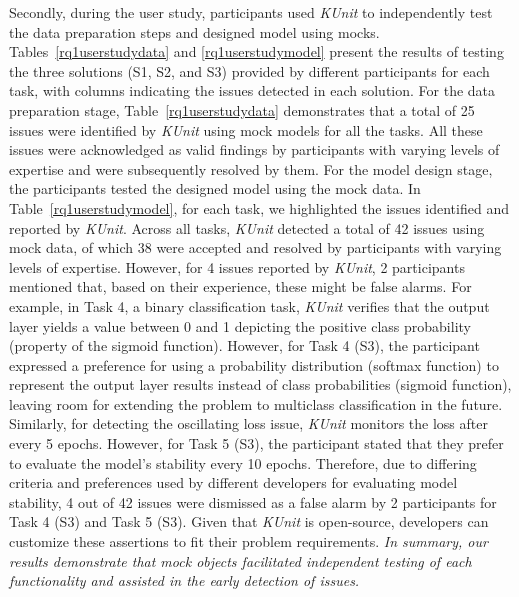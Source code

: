  
Secondly, during the user study, participants used {\em KUnit} to independently test the data preparation steps and designed model using mocks. Tables~\ref{rq1userstudydata} and \ref{rq1userstudymodel} present the results of testing the three solutions (S1, S2, and S3) provided by different participants for each task, with columns indicating the issues detected in each solution.
For the data preparation stage, Table~\ref{rq1userstudydata} demonstrates that a total of 25 issues were identified by {\em KUnit} using mock models for all the tasks.
All these issues were acknowledged as valid findings
by participants with varying levels of expertise and were subsequently resolved by them.
For the model design stage, the participants tested the designed model using the mock data. 
In Table~\ref{rq1userstudymodel}, 
for each task, we highlighted the issues identified and reported by {\em KUnit}. 
Across all tasks, {\em KUnit} detected a total of 42 issues using mock data, of which 38 were accepted and resolved by participants with varying levels of expertise.
However, for 4 issues reported by {\em KUnit}, 2 participants mentioned that, based on their experience, these might be false alarms.
For example, in Task 4, a binary classification task, {\em KUnit} verifies that the output layer yields a value between 0 and 1 depicting the positive class probability (property of the sigmoid function).
However, for Task 4 (S3), the participant expressed a preference for using a probability distribution (softmax function) to represent the output layer results instead of class probabilities (sigmoid function), leaving room for extending the problem to multiclass classification in the future.  
Similarly, for detecting the oscillating loss issue, {\em KUnit} monitors the loss after every 5 epochs. However, for Task 5 (S3), the participant stated that they prefer to evaluate the model's stability every 10 epochs.
Therefore, due to differing criteria and preferences used by different developers for evaluating model stability, 4 out of 42 issues were dismissed as a false alarm by 2 participants for Task 4 (S3) and Task 5 (S3). Given that {\em KUnit} is open-source, developers can customize these assertions to fit their problem requirements.
\textit{In summary, our results demonstrate that mock objects facilitated independent testing of each functionality and assisted in the early detection of issues.}




